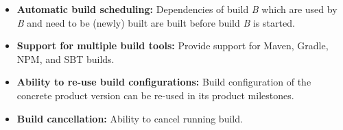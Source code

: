 \documentclass[../main.tex]{subfiles}
\begin{document}
\begin{itemize}
\begin{enumerate}
      \item \textbf{No later change guarantee:} any artifact with a Red Hat version cannot be changed later. In other words, once the uniquely identified artifact is produced (e.g. \textit{org.foo:bar:1.0.redhat-00001}) its hash remains the same for its whole lifecycle.\\
      \textbf{Note:} This helps with \textbf{build reproducibility} discussed previously.
  \end{enumerate}

  \textbf{Example:} Example of version increment together with dependency alignment is shown in Figure \ref{fig:alignment}.

\begin{figure}
  \begin{center}
    \texttt{[image: images/alignment.png]}
  \end{center}
  \caption{Example alignment of maven build}
  \label{fig:alignment}
\end{figure}

  \item \textbf{Automatic build scheduling:} Dependencies of build \textit{B} which are used by \textit{B} and need to be (newly) built are built before build \textit{B} is started.

  \item \textbf{Support for multiple build tools:} Provide support for Maven, Gradle, NPM, and SBT builds.

  \item \textbf{Ability to re-use build configurations:} Build configuration of the concrete product version can be re-used in its product milestones.

  \item \textbf{Build cancellation:} Ability to cancel running build.

\end{itemize}
\end{document}

